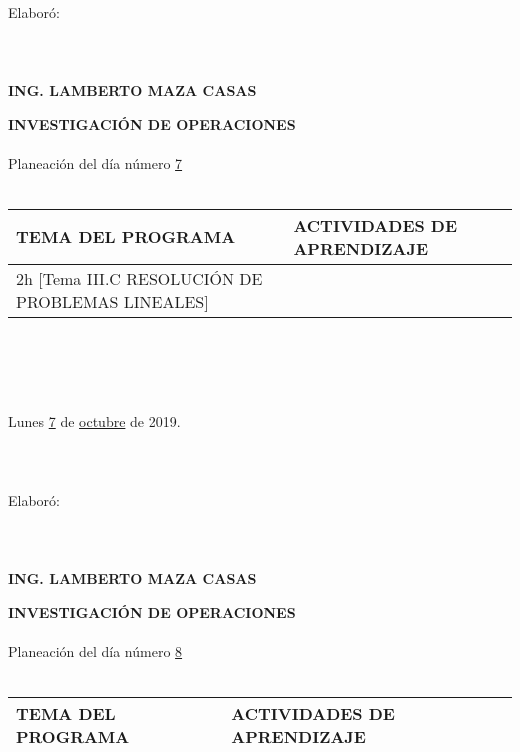 \documentclass[landscape]{article}
\begin{document}
{\begin{center}
\ \\
Elabor\'o:
\ \\
\ \\
\ \\
\ \\
{\bf ING. LAMBERTO MAZA CASAS}
\end{center}
\eject
\begin{center}
{\bf 
INVESTIGACI\'ON DE OPERACIONES
}
\ \\
\ \\
Planeaci\'on del d\'ia n\'umero \underline{\hspace{0.5cm}7\hspace{0.5cm}}
\ \\
\ \\
\begin{tabular}{|p{11cm}|p{8cm}|}\hline
{\bf TEMA DEL PROGRAMA}&{\bf ACTIVIDADES DE APRENDIZAJE}\\\hline
	2h	[Tema III.C RESOLUCI\'ON DE PROBLEMAS LI\-NEA\-LES]
&\\
\hline
\end{tabular}
\ \\
\ \\
\ \\
\ \\
Lunes \underline{\hspace{0.5cm}7\hspace{0.5cm}} de  \underline{\hspace{0.5cm}octubre\hspace{0.5cm}} de 2019.
\ \\
\ \\
\ \\
\ \\
Elabor\'o:
\ \\
\ \\
\ \\
\ \\
{\bf ING. LAMBERTO MAZA CASAS}
\end{center}
\eject
\begin{center}
{\bf 
INVESTIGACI\'ON DE OPERACIONES
}
\ \\
\ \\
Planeaci\'on del d\'ia n\'umero \underline{\hspace{0.5cm}8\hspace{0.5cm}}
\ \\
\ \\
\begin{tabular}{|p{11cm}|p{8cm}|}\hline
{\bf TEMA DEL PROGRAMA}&{\bf ACTIVIDADES DE APRENDIZAJE}\\\hline

\end{tabular}
\end{center}}
\end{document}
